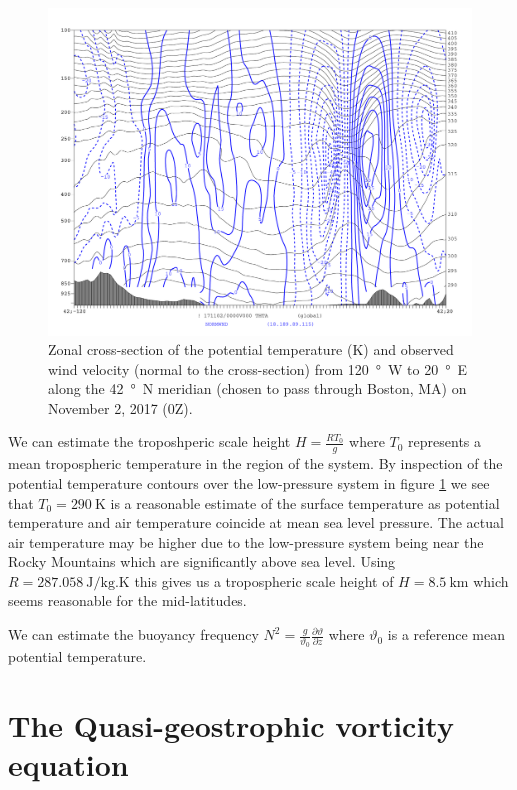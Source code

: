 \documentclass[11pt]{article}
\newcommand\p[2]{\frac{\partial #1}{\partial #2}}
\begin{document}
\begin{figure}[h!]
  \centering
  \includegraphics[width=\textwidth]{thta_normwnd_42N_120W-20E}
  \caption{Zonal cross-section of the potential temperature (K) and observed wind velocity (normal to the cross-section) from \SI{120}{\degree W} to \SI{20}{\degree E} along the \SI{42}{\degree N} meridian (chosen to pass through Boston, MA) on November 2, 2017 (0Z).}
  \label{fig:thta_normwnd_zon_xsec}
\end{figure}

We can estimate the troposhperic scale height $\displaystyle H = \frac{R T_0}{g}$ where $T_0$ represents a mean tropospheric temperature in the region of the system. By inspection of the potential temperature contours over the low-pressure system in figure \ref{fig:thta_normwnd_zon_xsec} we see that $T_0 = \SI{290}{\K}$ is a reasonable estimate of the surface temperature as potential temperature and air temperature coincide at mean sea level pressure. The actual air temperature may be higher due to the low-pressure system being near the Rocky Mountains which are significantly above sea level. Using $R = \SI{287.058}{\J/\kg.\K}$ this gives us a tropospheric scale height of $H = \SI{8.5}{\km}$ which seems reasonable for the mid-latitudes.

We can estimate the buoyancy frequency $\displaystyle N^2 = \frac{g}{\vartheta_0} \p{\vartheta}{z}$ where $\vartheta_0$ is a reference mean potential temperature.

\section{The Quasi-geostrophic vorticity equation}
\end{document}
